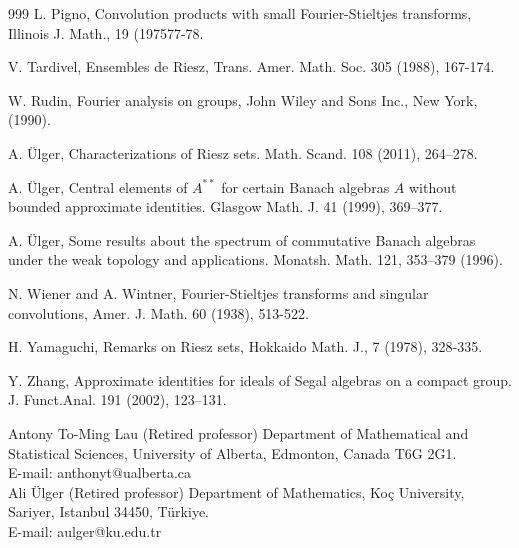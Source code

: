 \documentclass[12pt, twoside, leqno]{article}
\theoremstyle{definition}
\theoremstyle{definition}
\numberwithin{equation}{section}
\begin{document}
\begin{thebibliography}{999}
 L. Pigno, Convolution products with small Fourier-Stieltjes transforms, Illinois J. Math., 19 (197577-78. \vspace{2mm}

 V. Tardivel, Ensembles de Riesz, Trans. Amer. Math. Soc. 305 (1988), 167-174.\vspace{2mm}

 W. Rudin, Fourier analysis on groups, John Wiley and Sons Inc., New York, (1990). \vspace{2mm}

 A. Ülger, Characterizations of Riesz sets. Math. Scand. 108 (2011), 264–278.\vspace{2mm}

 A. Ülger, Central elements of $ A^{**} $ for certain Banach algebras $ A $ without bounded approximate identities. Glasgow Math. J. 41 (1999), 369–377.\vspace{2mm}

 A. Ülger, Some results about the spectrum of commutative Banach algebras under the weak topology and applications. Monatsh. Math. 121, 353–379 (1996).\vspace{2mm}

 N. Wiener and A. Wintner, Fourier-Stieltjes transforms and singular convolutions, Amer. J. Math. 60 (1938), 513-522.\vspace{2mm}

 H. Yamaguchi, Remarks on Riesz sets, Hokkaido Math. J., 7 (1978), 328-335.\vspace{2mm}

 Y. Zhang,   Approximate identities for ideals of Segal algebras on a compact group. J. Funct.Anal. 191 (2002), 123–131. \vspace{5mm}



\end{thebibliography} \vspace{4mm}



\noindent
Antony To-Ming Lau (Retired professor)
Department of Mathematical and Statistical Sciences, University of Alberta, Edmonton, Canada T6G 2G1.\\

\noindent
E-mail: anthonyt@ualberta.ca\\

\noindent
Ali Ülger (Retired professor)
Department of Mathematics, Koç University, Sariyer, Istanbul 34450, Türkiye.\\

\noindent
E-mail: aulger@ku.edu.tr

 

	       
\end{document}
